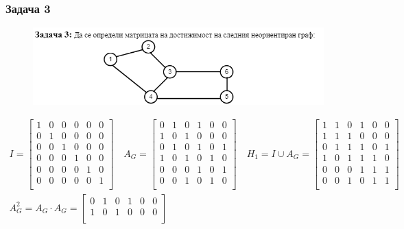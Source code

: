 \documentclass[fleqn, 12pt]{article}
\theoremstyle{definition}
\begin{document}
\subsubsection*{Задача 3}
\begin{figure} [htp!]
\includegraphics[width = \linewidth]{Pics/Discrete math/ex8/ex8-task3.png}
\end{figure}

\begin{gather*}
I = 
\begin{bmatrix}
1 & 0 & 0 & 0 & 0 & 0 \\
0 & 1 & 0 & 0 & 0 & 0 \\
0 & 0 & 1 & 0 & 0 & 0 \\
0 & 0 & 0 & 1 & 0 & 0 \\
0 & 0 & 0 & 0 & 1 & 0 \\
0 & 0 & 0 & 0 & 0 & 1  \\
\end{bmatrix} 
\quad 
A_G = 
\begin{bmatrix}
0 & 1 & 0 & 1 & 0 & 0 \\
1 & 0 & 1 & 0 & 0 & 0 \\
0 & 1 & 0 & 1 & 0 & 1 \\
1 & 0 & 1 & 0 & 1 & 0 \\
0 & 0 & 0 & 1 & 0 & 1 \\
0 & 0 & 1 & 0 & 1 & 0  \\
\end{bmatrix} 
\quad
H_1 = I \cup A_G = 
\begin{bmatrix}
1 & 1 & 0 & 1 & 0 & 0 \\
1 & 1 & 1 & 0 & 0 & 0 \\
0 & 1 & 1 & 1 & 0 & 1 \\
1 & 0 & 1 & 1 & 1 & 0 \\
0 & 0 & 0 & 1 & 1 & 1 \\
0 & 0 & 1 & 0 & 1 & 1  \\
\end{bmatrix} \\
A_G^2 = A_G \cdot A_G = 
\begin{bmatrix}
0 & 1 & 0 & 1 & 0 & 0 \\
1 & 0 & 1 & 0 & 0 & 0 \\

\end{bmatrix}
\end{gather*}
\end{document}
